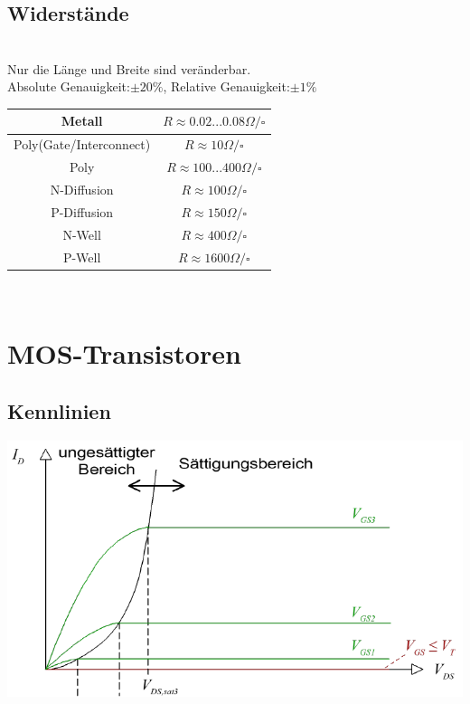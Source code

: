 \begin{minipage}{0.5\linewidth}
\subsection{Widerstände}
\vspace{5pt}\\
Nur die Länge und Breite sind veränderbar.\\
Absolute Genauigkeit:$ \pm 20 \%$,\hspace{5pt} Relative Genauigkeit:$\pm 1 \%$
\begin{center}
\begin{tabular}{|c|c|}
    \hline
    Metall                   & $R \approx 0.02...0.08\Omega/\square$ \\
    \hline
    Poly(Gate/Interconnect) &  $R \approx 10\Omega/\square$\\
    \hline
    Poly                    &  $R \approx 100...400\Omega/\square$\\
    \hline
    N-Diffusion             &  $R \approx 100\Omega/\square$ \\
    \hline
    P-Diffusion             &  $R \approx 150\Omega/\square$ \\
    \hline
    N-Well                  &  $R \approx 400\Omega/\square$ \\
    \hline
    P-Well                  &  $R \approx 1600\Omega/\square$\\
    \hline
    \end{tabular}
\end{center}
\end{minipage}\vspace{5pt}\\
\begin{minipage}{0.5\linewidth}
\section{MOS-Transistoren}
\subsection{Kennlinien}
\includegraphics[width=0.6\linewidth]{Ausgangskennlinie.png}
\end{minipage}%
